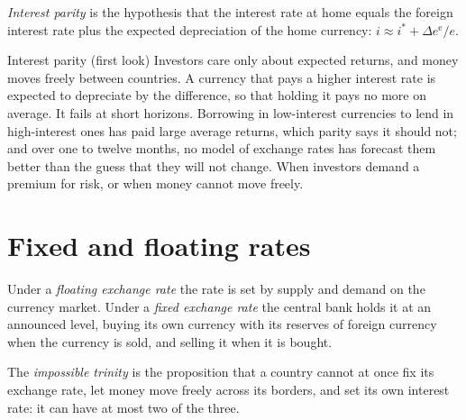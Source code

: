 \begin{definition}\label{def:g12:exchange-rates-and-balance-of-payments:interest-parity}
\emph{Interest parity} is the hypothesis that the interest rate at home equals the foreign interest rate plus the expected depreciation of the home
currency: $i \approx i^* + \Delta e^{\mathrm e}/e$.
\end{definition}

\begin{model}{Interest parity (first look)}
\assumes Investors care only about expected returns, and money moves freely between countries.
\predicts A currency that pays a higher interest rate is expected to depreciate by the difference, so that holding it pays no more on average.
\tested It fails at short horizons. Borrowing in low-interest currencies to lend in high-interest ones has paid large average returns, which parity says it should not; and over
  one to twelve months, no model of exchange rates has forecast them better than the guess that they will not change.
\breaks When investors demand a premium for risk, or when money cannot move freely.
\end{model}

\section{Fixed and floating rates}\label{sec:g12:exchange-rates-and-balance-of-payments:regimes}

\begin{definition}\label{def:g12:exchange-rates-and-balance-of-payments:floating}
Under a \emph{floating exchange rate} the rate is set by supply and demand on the currency market. Under a \emph{fixed exchange rate}\label{def:g12:exchange-rates-and-balance-of-payments:fixed} the central bank holds it at an announced level, buying its own currency with its
reserves of foreign currency when the currency is sold, and selling it when it is bought.
\end{definition}

\begin{definition}\label{def:g12:exchange-rates-and-balance-of-payments:trinity}
The \emph{impossible trinity} is the proposition that a country cannot at once fix its exchange rate, let money move freely across its borders, and
set its own interest rate: it can have at most two of the three.
\end{definition}

